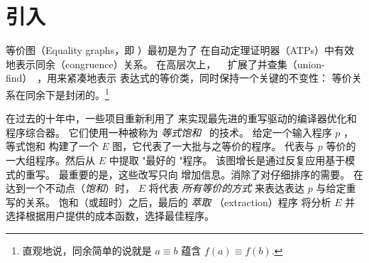 \section{引入}
\label{sec:intro}


等价图（Equality graphs，即 \egraph）最初是为了
  在自动定理证明器（ATPs）中有效地表示同余（congruence）关系。
在高层次上， \egraphs~\cite{nelson, pp-congr} 
  扩展了并查集（union-find）~\cite{unionfind}，用来紧凑地表示
  表达式的等价类，同时保持一个关键的不变性：
  等价关系在同余下是封闭的。\footnote{
    直观地说，同余简单的说就是
    $a \equiv b$ 蕴含 $f(a) \equiv f(b)$.}

    
在过去的十年中，一些项目重新利用了 \egraphs
  来实现最先进的重写驱动的编译器优化和程序综合器。
  它们使用一种被称为 \textit{等式饱和}~\cite{
    denali, eqsat, eqsat-llvm, szalinski, yogo-pldi20, spores, herbie} 的技术。
给定一个输入程序 $p$ ，
   等式饱和 构建了一个 $E$ 图，它代表了一大批与之等价的程序。
  代表与 $p$ 等价的一大组程序。然后从 $E$ 中提取 "最好的 "程序。
该图增长是通过反复应用基于模式的重写。
最重要的是，这些改写只向 \egraph 增加信息。消除了对仔细排序的需要。
在达到一个不动点（\textit{饱和}）时，
  $E$ 将代表 \textit{所有等价的方式} 来表达表达 $p$ 与给定重写的关系。
饱和（或超时）之后，最后的 \textit{萃取} （extraction）程序
  将分析 $E$ 并选择根据用户提供的成本函数，选择最佳程序。


